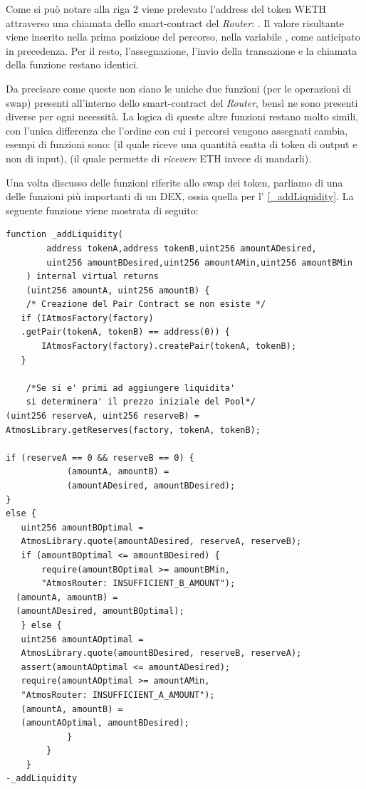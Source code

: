 Come si può notare alla riga 2 viene prelevato l'address del token WETH attraverso una chiamata dello smart-contract del \textit{Router}: . Il valore risultante viene inserito nella prima posizione del percorso, nella variabile , come anticipato in precedenza. Per il resto, l'assegnazione, l'invio della transazione e la chiamata della funzione restano identici.

Da precisare come queste non siano le uniche due funzioni (per le operazioni di swap) presenti all'interno dello smart-contract del \textit{Router}, bensì ne sono presenti diverse per ogni necessità. La logica di queste altre funzioni restano molto simili, con l'unica differenza che l'ordine con cui i percorsi vengono assegnati cambia, esempi di funzioni sono:  (il quale riceve una quantità esatta di token di output e non di input), (il quale permette di \textit{ricevere} ETH invece di mandarli).

Una volta discusso delle funzioni riferite allo swap dei token, parliamo di una delle funzioni più importanti di un DEX, ossia quella per l' \ref{_addLiquidity}.
La seguente funzione viene mostrata di seguito:\\

\begin{lstlisting}[caption={[\textcourier{\_addLiquidity()} Function]},language=Solidity] 
function _addLiquidity(
        address tokenA,address tokenB,uint256 amountADesired,
        uint256 amountBDesired,uint256 amountAMin,uint256 amountBMin
    ) internal virtual returns
    (uint256 amountA, uint256 amountB) {
    /* Creazione del Pair Contract se non esiste */
   if (IAtmosFactory(factory)
   .getPair(tokenA, tokenB) == address(0)) {
       IAtmosFactory(factory).createPair(tokenA, tokenB);
   }
   
    /*Se si e' primi ad aggiungere liquidita' 
    si determinera' il prezzo iniziale del Pool*/
(uint256 reserveA, uint256 reserveB) = 
AtmosLibrary.getReserves(factory, tokenA, tokenB);

if (reserveA == 0 && reserveB == 0) {
            (amountA, amountB) = 
            (amountADesired, amountBDesired);
} 
else {
   uint256 amountBOptimal = 
   AtmosLibrary.quote(amountADesired, reserveA, reserveB);
   if (amountBOptimal <= amountBDesired) {
       require(amountBOptimal >= amountBMin,
       "AtmosRouter: INSUFFICIENT_B_AMOUNT");
  (amountA, amountB) =
  (amountADesired, amountBOptimal);
   } else {
   uint256 amountAOptimal = 
   AtmosLibrary.quote(amountBDesired, reserveB, reserveA);
   assert(amountAOptimal <= amountADesired);
   require(amountAOptimal >= amountAMin, 
   "AtmosRouter: INSUFFICIENT_A_AMOUNT");
   (amountA, amountB) =
   (amountAOptimal, amountBDesired);
            }
        }
    }    											        	   			   -_addLiquidity
\end{lstlisting}\makeatletter{}\makeatother
\label{_addLiquidity}

